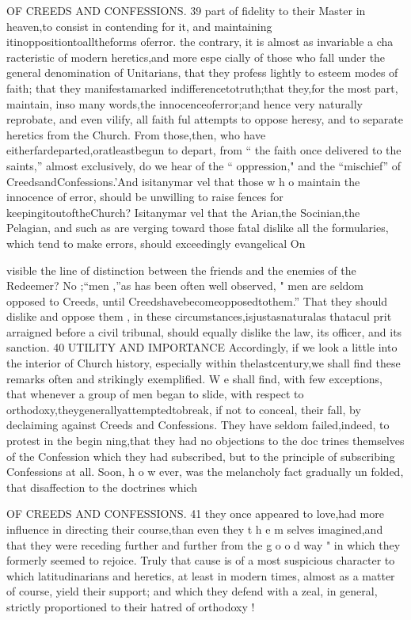 \documentclass[
]{book}
\begin{document}
OF CREEDS AND CONFESSIONS. 39
part of fidelity to their Master in heaven,to
consist in contending for it, and maintaining itinoppositiontoalltheforms oferror.
the contrary, it is almost as invariable a cha racteristic of modern heretics,and more espe
cially of those who fall under the general denomination of Unitarians, that they profess
lightly to esteem modes of faith; that they manifestamarked indifferencetotruth;that
they,for the most part, maintain, inso many words,the innocenceoferror;and hence very naturally reprobate, and even vilify, all faith ful attempts to oppose heresy, and to separate
heretics from the Church. From those,then, who have eitherfardeparted,oratleastbegun to depart, from `` the faith once delivered to
the saints,'' almost exclusively, do we hear of the `` oppression," and the ``mischief'' of CreedsandConfessions.'And isitanymar vel that those w h o maintain the innocence of
error, should be unwilling to raise fences for
keepingitoutoftheChurch? Isitanymar vel that the Arian,the Socinian,the Pelagian,
and such as are verging toward those fatal
dislike all the formularies, which tend to make
errors, should exceedingly evangelical
On

visible the line of distinction between the friends and the enemies of the Redeemer? No ;``men ,''as has been often well observed, " men are seldom opposed to Creeds, until Creedshavebecomeopposedtothem.'' That they should dislike and oppose them , in these
circumstances,isjustasnaturalas thatacul prit arraigned before a civil tribunal, should equally dislike the law, its officer, and its sanction.
40 UTILITY AND IMPORTANCE
Accordingly, if we look a little into the interior of Church history, especially within thelastcentury,we shall find these remarks
often and strikingly exemplified. W e shall find, with few exceptions, that whenever a group of men began to slide, with respect to orthodoxy,theygenerallyattemptedtobreak, if not to conceal, their fall, by declaiming against Creeds and Confessions. They have
seldom failed,indeed, to protest in the begin ning,that they had no objections to the doc trines themselves of the Confession which
they had subscribed, but to the principle of subscribing Confessions at all. Soon, h o w ever, was the melancholy fact gradually un folded, that disaffection to the doctrines which

OF CREEDS AND CONFESSIONS. 41
they once appeared to love,had more influence in directing their course,than even they t h e m selves imagined,and that they were receding further and further from the g o o d way " in
which they formerly seemed to rejoice. Truly that cause is of a most suspicious character to which latitudinarians and heretics, at least in modern times, almost as a matter of course, yield their support; and which they defend
with a zeal, in general, strictly proportioned to their hatred of orthodoxy !
\end{document}
